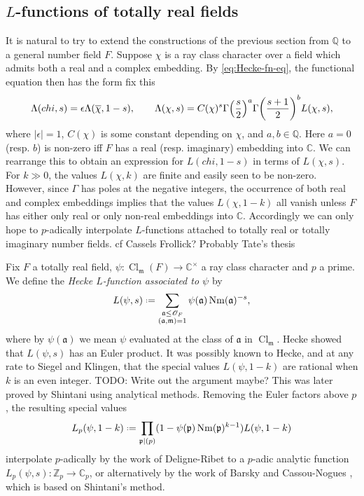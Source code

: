 \documentclass[11pt,a4paper]{article}
\let\mf\mathfrak
\newcommand{\Z}{\mathbb{Z}}
\newcommand{\Q}{\mathbb{Q}}
\newcommand{\C}{\mathbb{C}}
\renewcommand{\O}{\mathscr{O}}
\newcommand*{\defeq}{\mathrel{\vcenter{\baselineskip0.5ex \lineskiplimit0pt
      \hbox{\scriptsize.}\hbox{\scriptsize.}}}%
  =}
\renewcommand{\bar}{\overline}
\DeclareMathOperator{\Nm}{Nm}
\DeclareMathOperator{\Cl}{Cl}
\theoremstyle{plain}
\theoremstyle{definition}
\theoremstyle{remark}
\numberwithin{equation}{section}
\begin{document}
\subsection{$L$-functions of totally real fields}
It is natural to try to extend the constructions of the previous
section from $\Q$ to a general number field $F$. Suppose $\chi$ is a
ray class character over a field which admits both a real and a complex
embedding. By \cref{eq:Hecke-fn-eq}, the functional equation then has
the form {\color{red} fix this}
\begin{equation}
  \label{eq:2}
\Lambda(chi,s)  = \epsilon \Lambda(\bar \chi,1-s), \qq{}  \Lambda(\chi,s) =
C(\chi)^{s}\Gamma\qty(\frac{s}{2})^{a}\Gamma\qty(\frac{s+1}{2})^{b}L(\chi, s),
\end{equation}
where $|\epsilon| =1$, $C(\chi)$ is some constant depending on $\chi$, and
$a,b \in \Q$. Here $a = 0$ (resp. $b$) is non-zero iff $F$ has a real
(resp. imaginary) embedding into $\C$. We can rearrange this to obtain
an expression for $L(chi,1-s)$ in terms of $L(\chi,s)$. For $k\gg 0$, the
values $L(\chi,k)$ are finite and easily seen to be non-zero. However,
since $\Gamma$ has poles at the negative integers, the occurrence of both
real and complex embeddings implies that the values $L(\chi,1-k)$ all
vanish unless $F$ has either only real or only non-real embeddings
into $\C$. Accordingly we can only hope to $p$-adically interpolate
$L$-functions attached to totally real or totally imaginary number
fields.  cf {\color{red}Cassels Frollick? Probably Tate's thesis}

Fix $F$ a totally real field, $\psi \colon \Cl_{\mf m}(F) \to \C^{\times}$ a
ray class character and $p$ a prime. We define the \emph{Hecke $L$-function
  associated to $\psi$} by
\begin{equation}
  \label{eq:1}
  L(\psi,s) \defeq \sum_{\substack{\mf a \leq \O_{F}\\ (\mf a, \mf m) =1}} \psi(\mf a)\Nm(\mf a)^{-s},
\end{equation}
where by $\psi(\mf a)$ we mean $\psi$ evaluated at the class of $\mf a$ in
$\Cl_{\mf m}$. Hecke showed that $L(\psi,s)$ has an Euler product. 
It was possibly known to Hecke, and at any rate to Siegel and Klingen,
that the special values $L(\psi, 1-k)$ are rational when $k$ is an even
integer.
{\color{red} TODO: Write out the argument maybe?}
This was later proved by Shintani using analytical methods.
Removing the Euler factors above $p$, the resulting special values
\begin{equation}
  \label{eq:3}
L_{p}(\psi,1-k) \defeq  \prod_{\mf p \mid (p)}(1- \psi(\mf p) \Nm(\mf p )^{k-1}) L(\psi,1-k)
\end{equation}
interpolate $p$-adically by the work of Deligne-Ribet
\cite{deligne1980} to a $p$-adic analytic function $L_{p}(\psi,s)\colon
\Z_{p}\to \C_{p}$, or alternatively by the work of Barsky and
Cassou-Nogues \cite{cassou-nogues1979}, which is based on Shintani's method.
\end{document}
